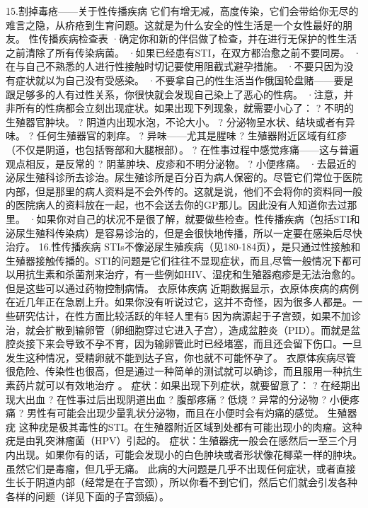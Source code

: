 \documentclass[12pt,UTF8]{ctexbook}
\begin{document}
15.割掉毒疮——关于性传播疾病
它们有增无减，高度传染，它们会带给你无尽的难言之隐，从疥疮到生育问题。这就是为什么安全的性生活是一个女性最好的朋友。
性传播疾病检查表
·确定你和新的伴侣做了检查，并在进行无保护的性生活之前清除了所有传染病菌。
·如果已经患有STI，在双方都治愈之前不要同房。
·在与自己不熟悉的人进行性接触时切记要使用阻截式避孕措施。
·不要只因为没有症状就以为自己没有受感染。
·不要拿自己的性生活当作俄国轮盘赌——要是跟足够多的人有过性关系，你很快就会发现自己染上了恶心的性病。
·注意，并非所有的性病都会立刻出现症状。如果出现下列现象，就需要小心了：
? 不明的生殖器官肿块。
? 阴道内出现水泡，不论大小。
? 分泌物呈水状、结块或者有异味。
? 任何生殖器官的刺痒。
? 异味——尤其是腥味
? 生殖器附近区域有红疹（不仅是阴道，也包括臀部和大腿根部）。
? 在性事过程中感觉疼痛——这与普遍观点相反，是反常的
? 阴茎肿块、皮疹和不明分泌物。
? 小便疼痛。
·去最近的泌尿生殖科诊所去诊治。尿生殖诊所是百分百为病人保密的。尽管它们常位于医院内部，但是那里的病人资料是不会外传的。这就是说，他们不会将你的资料同一般的医院病人的资料放在一起，也不会送去你的GP那儿。因此没有人知道你去过那里。
·如果你对自己的状况不是很了解，就要做些检查。性传播疾病（包括STI和泌尿生殖科传染病）是容易诊治的，但是会很快地传播，所以一定要在感染后尽快治疗。
16.性传播疾病
STIs不像泌尿生殖疾病（见180-184页），是只通过性接触和生殖器接触传播的。STI的问题是它们往往不显现症状，而且,尽管一般情况下都可以用抗生素和杀菌剂来治疗，有一些例如HIV、湿疣和生殖器疱疹是无法治愈的。但是这些可以通过药物控制病情。
衣原体疾病
近期数据显示，衣原体疾病的病例在近几年正在急剧上升。如果你没有听说过它，这并不奇怪，因为很多人都是。一些研究估计，在性方面比较活跃的年轻人里有5%
因为病源起于子宫颈，如果不加诊治，就会扩散到输卵管（卵细胞穿过它进入子宫），造成盆腔炎（PID）。而就是盆腔炎接下来会导致不孕不育，因为输卵管此时已经堵塞，而且还会留下伤口。一旦发生这种情况，受精卵就不能到达子宫，你也就不可能怀孕了。
衣原体疾病尽管很危险、传染性也很高，但是通过一种简单的测试就可以确诊，而且服用一种抗生素药片就可以有效地治疗 。
症状：如果出现下列症状，就要留意了：
? 在经期出现大出血
? 在性事过后出现阴道出血
? 腹部疼痛
? 低烧
? 异常的分泌物
? 小便疼痛
? 男性有可能会出现少量乳状分泌物，而且在小便时会有灼痛的感觉。
生殖器疣
这种疣是极其毒性的STI。在生殖器附近区域到处都有可能出现小的肉瘤。这种疣是由乳突淋瘤菌（HPV）引起的。
症状：生殖器疣一般会在感然后一至三个月内出现。如果你有的话，可能会发现小的白色肿块或者形状像花椰菜一样的肿块。虽然它们是毒瘤，但几乎无痛。
此病的大问题是几乎不出现任何症状，或者直接生长于阴道内部（经常是在子宫颈），所以你看不到它们，然后它们就会引发各种各样的问题（详见下面的子宫颈癌）。
\end{document}
